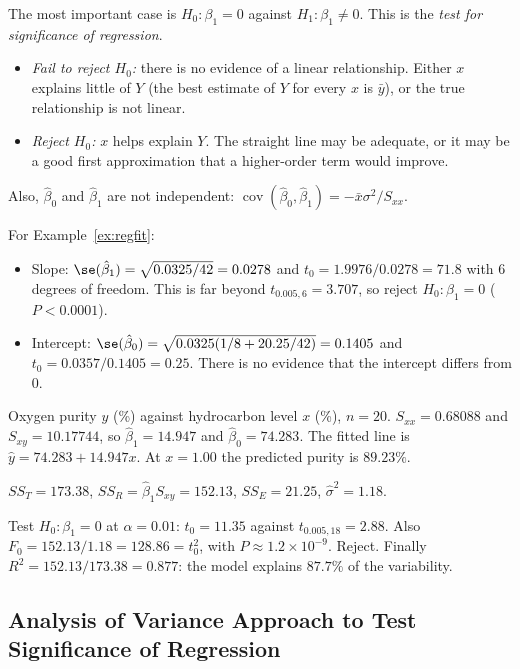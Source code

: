 The most important case is $H_0:\beta_1=0$ against $H_1:\beta_1\ne0$. This is the \emph{test for significance of regression}.
\begin{itemize}
  \item \emph{Fail to reject $H_0$:} there is no evidence of a linear relationship. Either $x$ explains little of $Y$ (the best estimate of $Y$ for every $x$ is $\bar{y}$), or the true relationship is not linear.
  \item \emph{Reject $H_0$:} $x$ helps explain $Y$. The straight line may be adequate, or it may be a good first approximation that a higher-order term would improve.
\end{itemize}
Also, $\hat\beta_0$ and $\hat\beta_1$ are not independent: $\operatorname{cov}(\hat\beta_0,\hat\beta_1)=-\bar{x}\sigma^2/S_{xx}$.

\begin{example}
For Example~\ref{ex:regfit}:
\begin{itemize}
  \item Slope: $\se(\hat\beta_1)=\sqrt{0.0325/42}=0.0278$ and $t_0=1.9976/0.0278=71.8$ with $6$ degrees of freedom. This is far beyond $t_{0.005,6}=3.707$, so reject $H_0:\beta_1=0$ ($P<0.0001$).
  \item Intercept: $\se(\hat\beta_0)=\sqrt{0.0325(1/8+20.25/42)}=0.1405$ and $t_0=0.0357/0.1405=0.25$. There is no evidence that the intercept differs from $0$.
\end{itemize}
\end{example}

\begin{example}
Oxygen purity $y$ (\%) against hydrocarbon level $x$ (\%), $n=20$. $S_{xx}=0.68088$ and $S_{xy}=10.17744$, so $\hat\beta_1=14.947$ and $\hat\beta_0=74.283$. The fitted line is $\hat{y}=74.283+14.947x$. At $x=1.00$ the predicted purity is $89.23\%$.

$SS_T=173.38$, $SS_R=\hat\beta_1S_{xy}=152.13$, $SS_E=21.25$, $\hat\sigma^2=1.18$.

Test $H_0:\beta_1=0$ at $\alpha=0.01$: $t_0=11.35$ against $t_{0.005,18}=2.88$. Also $F_0=152.13/1.18=128.86=t_0^2$, with $P\approx1.2\times10^{-9}$. Reject. Finally $R^2=152.13/173.38=0.877$: the model explains $87.7\%$ of the variability.
\end{example}

\subsection{Analysis of Variance Approach to Test Significance of Regression}

